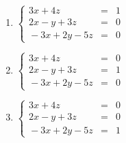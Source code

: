\begin{multicols}{3}
\begin{enumerate}
\setcounter{enumi}{\value{HW}}

\item $\left\{ \begin{array}{rcr}   3x + 4z & = & 1 \\ 2x - y + 3z & = & 0 \\ \!-3x + 2y - 5z & = & 0  \end{array} \right.$ \label{3by3inversefirst}
\item $\left\{ \begin{array}{rcr}   3x + 4z & = & 0 \\ 2x - y + 3z & = & 1 \\ \!-3x + 2y - 5z & = & 0  \end{array} \right.$
\item $\left\{ \begin{array}{rcr}   3x + 4z & = & 0 \\ 2x - y + 3z & = & 0 \\ \!-3x + 2y - 5z & = & 1  \end{array} \right.$ \label{3by3inverselast}

\setcounter{HW}{\value{enumi}}
\end{enumerate}
\end{multicols}

